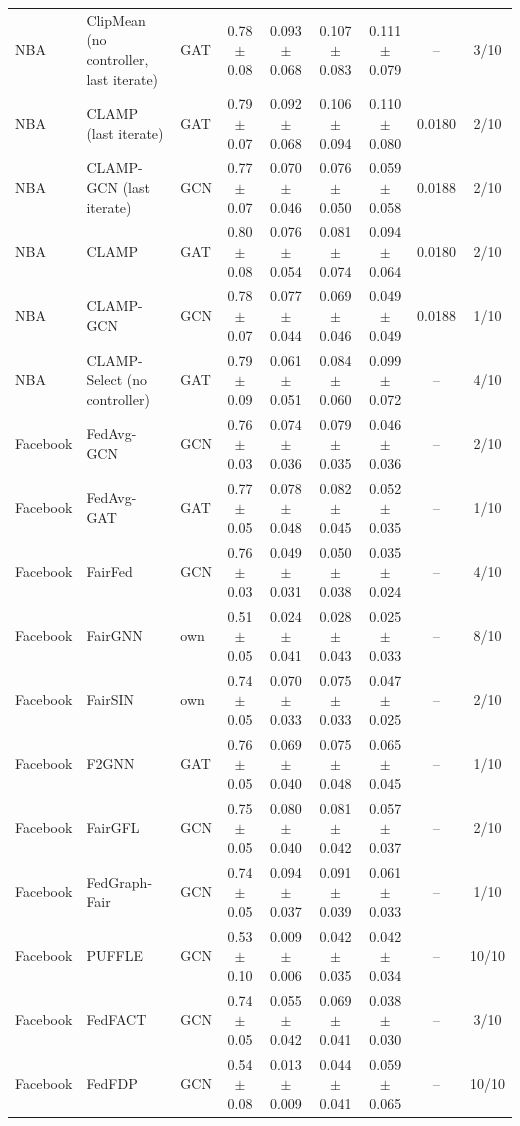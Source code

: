 \begin{longtable}{lp{2.2cm}lcccccc}
NBA & ClipMean (no controller, last iterate) & GAT & 0.78$\pm$0.08 & 0.093$\pm$0.068 & 0.107$\pm$0.083 & 0.111$\pm$0.079 & -- & 3/10 \\
NBA & CLAMP (last iterate) & GAT & 0.79$\pm$0.07 & 0.092$\pm$0.068 & 0.106$\pm$0.094 & 0.110$\pm$0.080 & 0.0180 & 2/10 \\
NBA & CLAMP-GCN (last iterate) & GCN & 0.77$\pm$0.07 & 0.070$\pm$0.046 & 0.076$\pm$0.050 & 0.059$\pm$0.058 & 0.0188 & 2/10 \\
NBA & CLAMP & GAT & 0.80$\pm$0.08 & 0.076$\pm$0.054 & 0.081$\pm$0.074 & 0.094$\pm$0.064 & 0.0180 & 2/10 \\
NBA & CLAMP-GCN & GCN & 0.78$\pm$0.07 & 0.077$\pm$0.044 & 0.069$\pm$0.046 & 0.049$\pm$0.049 & 0.0188 & 1/10 \\
NBA & CLAMP-Select (no controller) & GAT & 0.79$\pm$0.09 & 0.061$\pm$0.051 & 0.084$\pm$0.060 & 0.099$\pm$0.072 & -- & 4/10 \\
Facebook & FedAvg-GCN & GCN & 0.76$\pm$0.03 & 0.074$\pm$0.036 & 0.079$\pm$0.035 & 0.046$\pm$0.036 & -- & 2/10 \\
Facebook & FedAvg-GAT & GAT & 0.77$\pm$0.05 & 0.078$\pm$0.048 & 0.082$\pm$0.045 & 0.052$\pm$0.035 & -- & 1/10 \\
Facebook & FairFed & GCN & 0.76$\pm$0.03 & 0.049$\pm$0.031 & 0.050$\pm$0.038 & 0.035$\pm$0.024 & -- & 4/10 \\
Facebook & FairGNN & own & 0.51$\pm$0.05 & 0.024$\pm$0.041 & 0.028$\pm$0.043 & 0.025$\pm$0.033 & -- & 8/10 \\
Facebook & FairSIN & own & 0.74$\pm$0.05 & 0.070$\pm$0.033 & 0.075$\pm$0.033 & 0.047$\pm$0.025 & -- & 2/10 \\
Facebook & F2GNN & GAT & 0.76$\pm$0.05 & 0.069$\pm$0.040 & 0.075$\pm$0.048 & 0.065$\pm$0.045 & -- & 1/10 \\
Facebook & FairGFL & GCN & 0.75$\pm$0.05 & 0.080$\pm$0.040 & 0.081$\pm$0.042 & 0.057$\pm$0.037 & -- & 2/10 \\
Facebook & FedGraph-Fair & GCN & 0.74$\pm$0.05 & 0.094$\pm$0.037 & 0.091$\pm$0.039 & 0.061$\pm$0.033 & -- & 1/10 \\
Facebook & PUFFLE & GCN & 0.53$\pm$0.10 & 0.009$\pm$0.006 & 0.042$\pm$0.035 & 0.042$\pm$0.034 & -- & 10/10 \\
Facebook & FedFACT & GCN & 0.74$\pm$0.05 & 0.055$\pm$0.042 & 0.069$\pm$0.041 & 0.038$\pm$0.030 & -- & 3/10 \\
Facebook & FedFDP & GCN & 0.54$\pm$0.08 & 0.013$\pm$0.009 & 0.044$\pm$0.041 & 0.059$\pm$0.065 & -- & 10/10 \\

\end{longtable}
